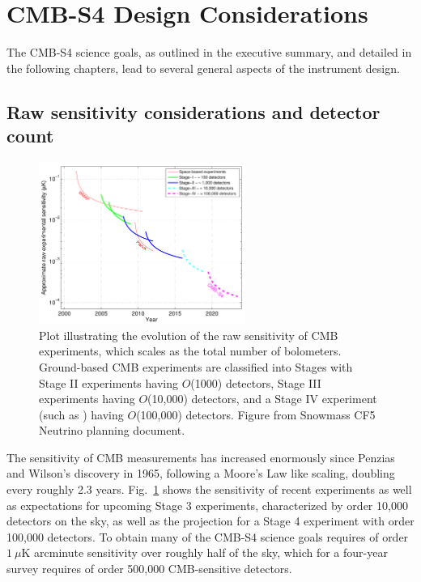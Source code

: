 \section{CMB-S4 Design Considerations}

The CMB-S4 science goals, as outlined in the executive summary, and detailed in the following chapters, lead to several general aspects of the instrument design.  



\subsection{Raw sensitivity considerations and detector count}

\begin{figure}[t]
\centering \includegraphics[width=0.6\textwidth]{Intro/expt_progress.pdf}
\caption{Plot illustrating the evolution of the raw sensitivity of CMB
  experiments, which scales as the total number of
  bolometers. Ground-based CMB experiments are classified into Stages
  with Stage II experiments having $O$(1000) detectors, Stage III
  experiments having $O$(10,000) detectors, and a Stage IV experiment
  (such as \cmbexp) having $O$(100,000) detectors. Figure from Snowmass  CF5
  Neutrino planning document.}
\label{fig:expt_progress-intro}
\end{figure}

The sensitivity of CMB measurements has increased enormously since Penzias and Wilson's discovery in 1965, following a Moore's Law like scaling, doubling every roughly 2.3 years. Fig.~\ref{fig:expt_progress-intro} shows the sensitivity of recent experiments as well as expectations for upcoming Stage 3 experiments, characterized by order 10,000 detectors on the sky, as well as the projection for a Stage 4 experiment with order 100,000 detectors. To obtain many of the CMB-S4 science goals requires of order $1~\mu$K arcminute sensitivity over roughly half of the sky, which for a four-year survey requires of order 500,000 CMB-sensitive detectors. 

